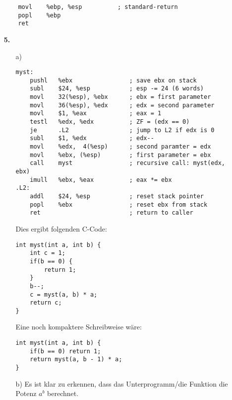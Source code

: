 \documentclass[a4paper,10pt]{scrartcl}
\begin{document}
\begin{enumerate}
\begin{verbatim}
    movl    %ebp, %esp          ; standard-return
    popl    %ebp
    ret
\end{verbatim}

    \newpage
    \item[\textbf{5.}]
        \begin{enumerate}
            \item[a)]

                \begin{verbatim}
myst:
    pushl   %ebx                ; save ebx on stack
    subl    $24, %esp           ; esp -= 24 (6 words)
    movl    32(%esp), %ebx      ; ebx = first parameter
    movl    36(%esp), %edx      ; edx = second parameter
    movl    $1, %eax            ; eax = 1
    testl   %edx, %edx          ; ZF = (edx == 0)
    je      .L2                 ; jump to L2 if edx is 0
    subl    $1, %edx            ; edx--
    movl    %edx,  4(%esp)      ; second paramter = edx
    movl    %ebx, (%esp)        ; first parameter = ebx
    call    myst                ; recursive call: myst(edx, ebx)
    imull   %ebx, %eax          ; eax *= ebx
.L2:
    addl    $24, %esp           ; reset stack pointer
    popl    %ebx                ; reset ebx from stack
    ret                         ; return to caller
\end{verbatim}

                Dies ergibt folgenden C-Code:

                \begin{verbatim}
int myst(int a, int b) {
    int c = 1;
    if(b == 0) {
        return 1;
    }
    b--;
    c = myst(a, b) * a;
    return c;
}
\end{verbatim}

                Eine noch kompaktere Schreibweise wäre:

                \begin{verbatim}
int myst(int a, int b) {
    if(b == 0) return 1;
    return myst(a, b - 1) * a;
}
\end{verbatim}

            \item[b)]
                Es ist klar zu erkennen, dass das Unterprogramm/die Funktion die Potenz $a^b$ berechnet.


\end{enumerate}
\end{enumerate}
\end{document}
